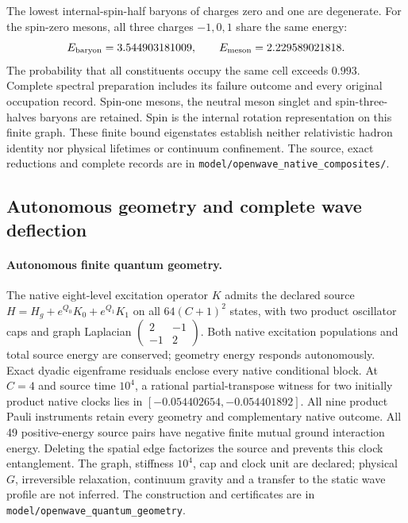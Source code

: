 The lowest internal-spin-half baryons of charges zero and one are degenerate.
For the spin-zero mesons, all three charges $-1,0,1$ share the same energy:
\[
 E_{\rm baryon}=3.544903181009,\qquad E_{\rm meson}=2.229589021818.
\]
The probability that all constituents occupy the same cell exceeds $0.993$.
Complete spectral preparation includes its failure outcome and every original
occupation record. Spin-one mesons, the neutral meson singlet and spin-three-halves
baryons are retained. Spin is the internal rotation representation on this
finite graph. These finite bound eigenstates establish neither relativistic
hadron identity nor physical lifetimes or continuum confinement.
The source, exact reductions and complete records are in
\texttt{model/openwave\_native\_composites/}.



\subsection{Autonomous geometry and complete wave deflection}


\paragraph{Autonomous finite quantum geometry.}
The native eight-level excitation operator $K$ admits the declared source
$H=H_g+e^{Q_0}K_0+e^{Q_1}K_1$ on all $64(C+1)^2$ states, with two product
oscillator caps and graph Laplacian
$\left(\begin{smallmatrix}2&-1\\-1&2\end{smallmatrix}\right)$.
Both native excitation populations and total source energy are conserved;
geometry energy responds autonomously. Exact dyadic eigenframe residuals
enclose every native conditional block. At $C=4$ and source time $10^4$,
a rational partial-transpose witness for two initially product native
clocks lies in $[-0.054402654,-0.054401892]$. All nine product Pauli
instruments retain every geometry and complementary native outcome.
All 49 positive-energy source pairs have negative finite mutual ground
interaction energy. Deleting the spatial edge factorizes the source and
prevents this clock entanglement. The graph, stiffness $10^4$, cap and
clock unit are declared; physical $G$, irreversible relaxation,
continuum gravity and a transfer to the static wave profile are not
inferred. The construction and certificates are in
\texttt{model/openwave\_quantum\_geometry}.


